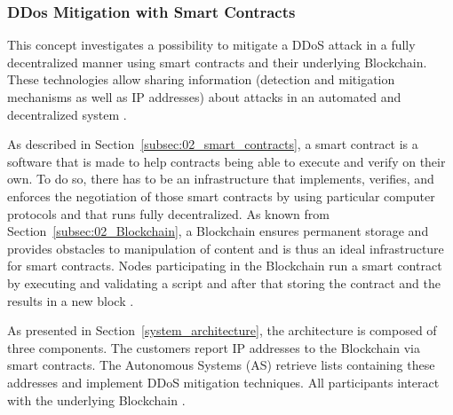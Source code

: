 \subsubsection{DDos Mitigation with Smart Contracts}
This concept investigates a possibility to mitigate a DDoS attack in a fully decentralized manner using smart contracts and their underlying Blockchain. These technologies allow sharing information (detection and mitigation mechanisms as well as IP addresses) about attacks in an automated and decentralized system \cite{Rodrigues2017}.

As described in Section~\ref{subsec:02_smart_contracts}, a smart contract is a software that is made to help contracts being able to execute and verify on their own. To do so, there has to be an infrastructure that implements, verifies, and enforces the negotiation of those smart contracts by using particular computer protocols and that runs fully decentralized. As known from Section~\ref{subsec:02_Blockchain}, a Blockchain ensures permanent storage and provides obstacles to manipulation of content and is thus an ideal infrastructure for smart contracts. Nodes participating in the Blockchain run a smart contract by executing and validating a script and after that storing the contract and the results in a new block \cite{Rodrigues2017}.

As presented in Section~\ref{system_architecture}, the architecture is composed of three components. The customers report IP addresses to the Blockchain via smart contracts. The Autonomous Systems (AS) retrieve lists containing these addresses and implement DDoS mitigation techniques. All participants interact with the underlying Blockchain \cite{Rodrigues2017}.

